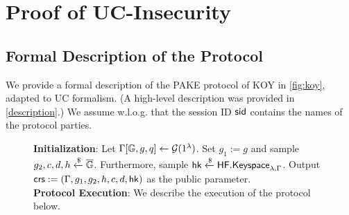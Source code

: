 
\section{Proof of UC-Insecurity}

\subsection{Formal Description of the Protocol}

We provide a formal description of the PAKE protocol of KOY in \cref{fig:koy}, adapted to UC formalism. (A high-level description was provided in \cref{description}.) We assume w.l.o.g. that the session ID $\mathsf{sid}$ contains the names of the protocol parties.

	\begin{figure}[tbp]
	\begin{framed}\small

		\textbf{Initialization}: Let $\Gamma[\mathbb{G},g,q]\gets\mathcal{G}(1^\lambda)$. Set $g_1 := g$ and sample $g_2, c, d, h\xleftarrow{\$}\overline{\mathbb{G}}$. Furthermore, sample $\mathsf{hk}\xleftarrow{\$}\mathsf{HF.Keyspace}_{\lambda,\Gamma}$. Output $\mathsf{crs} := (\Gamma,g_1, g_2,h,c,d,\mathsf{hk})$ as the public parameter.\\
		
		\textbf{Protocol Execution}: We describe the execution of the protocol below.
		

\end{framed}
\end{figure}
